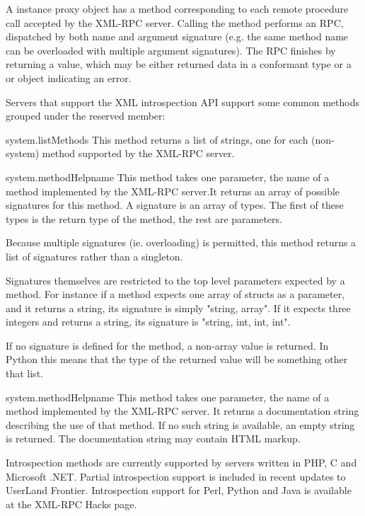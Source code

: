 A  instance proxy object has a method corresponding to
each remote procedure call accepted by the XML-RPC server.  Calling
the method performs an RPC, dispatched by both name and argument
signature (e.g. the same method name can be overloaded with multiple
argument signatures).  The RPC finishes by returning a value, which
may be either returned data in a conformant type or a  or
 object indicating an error.

Servers that support the XML introspection API support some common
methods grouped under the reserved  member:

\begin{methoddesc}{system.listMethods}{}
This method returns a list of strings, one for each (non-system)
method supported by the XML-RPC server.
\end{methoddesc}

\begin{methoddesc}{system.methodHelp}{name}
This method takes one parameter, the name of a method implemented by
the XML-RPC server.It returns an array of possible signatures for this
method. A signature is an array of types. The first of these types is
the return type of the method, the rest are parameters.

Because multiple signatures (ie. overloading) is permitted, this method
returns a list of signatures rather than a singleton.

Signatures themselves are restricted to the top level parameters
expected by a method. For instance if a method expects one array of
structs as a parameter, and it returns a string, its signature is
simply "string, array". If it expects three integers and returns a
string, its signature is "string, int, int, int".

If no signature is defined for the method, a non-array value is
returned. In Python this means that the type of the returned 
value will be something other that list.
\end{methoddesc}

\begin{methoddesc}{system.methodHelp}{name}
This method takes one parameter, the name of a method implemented by
the XML-RPC server.  It returns a documentation string describing the
use of that method. If no such string is available, an empty string is
returned. The documentation string may contain HTML markup.  
\end{methoddesc}

Introspection methods are currently supported by servers written in
PHP, C and Microsoft .NET. Partial introspection support is included
in recent updates to UserLand Frontier. Introspection support for
Perl, Python and Java is available at the XML-RPC Hacks page.

